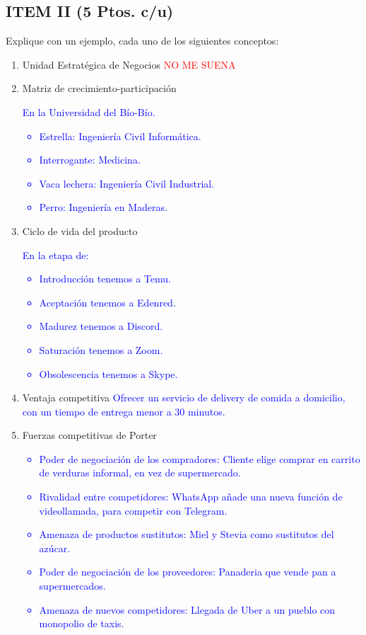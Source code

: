 \documentclass{templateNote}
\begin{document}
\subsection*{ITEM II (5 Ptos. c/u)}
Explique con un ejemplo, cada uno de los siguientes conceptos: 

\begin{enumerate}
    \item Unidad Estratégica de Negocios\newline
    \textcolor{red}{
        NO ME SUENA
    }
    
    \item Matriz de crecimiento-participación\newline
    \textcolor{blue}{
        En la Universidad del Bío-Bío.
        \begin{itemize}
            \item Estrella: Ingeniería Civil Informática.
            \item Interrogante: Medicina.
            \item Vaca lechera: Ingeniería Civil Industrial.
            \item Perro: Ingeniería en Maderas.
        \end{itemize}
    }
    \item Ciclo de vida del producto\newline
    \textcolor{blue}{
        En la etapa de:
        \begin{itemize}
            \item Introducción tenemos a Temu.
            \item Aceptación tenemos a Edenred.
            \item Madurez tenemos a Discord.
            \item Saturación tenemos a Zoom.
            \item Obsolescencia tenemos a Skype.
        \end{itemize}
    }
    \item Ventaja competitiva\newline
    \textcolor{blue}{
        Ofrecer un servicio de delivery de comida a domicilio, con un tiempo de entrega menor a 30 minutos.
    }
    \item Fuerzas competitivas de Porter
    \textcolor{blue}{
        \begin{itemize}
            \item Poder de negociación de los compradores: Cliente elige comprar en carrito de verduras informal, en vez de supermercado.
            \item Rivalidad entre competidores: WhatsApp añade una nueva función de videollamada, para competir con Telegram.
            \item Amenaza de productos sustitutos: Miel y Stevia como sustitutos del azúcar.
            \item Poder de negociación de los proveedores: Panaderia que vende pan a supermercados.
            \item Amenaza de nuevos competidores: Llegada de Uber a un pueblo con monopolio de taxis.
        \end{itemize}
    }
\end{enumerate}
\end{document}
